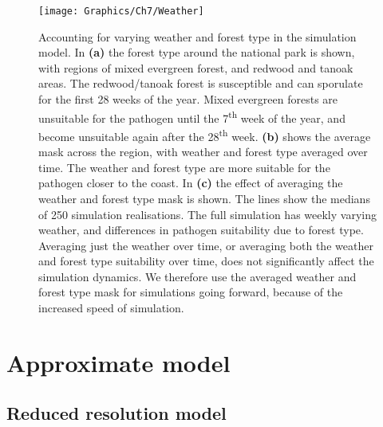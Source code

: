 \begin{figure}
    \begin{center}
        \texttt{[image: Graphics/Ch7/Weather]}
        \caption[Acounting for weather and forest type in the simulation model]{Accounting for varying weather and forest type in the simulation model. In \textbf{(a)} the forest type around the national park is shown, with regions of mixed evergreen forest, and redwood and tanoak areas. The redwood/tanoak forest is susceptible and can sporulate for the first 28 weeks of the year. Mixed evergreen forests are unsuitable for the pathogen until the 7\textsuperscript{th} week of the year, and become unsuitable again after the 28\textsuperscript{th} week. \textbf{(b)} shows the average mask across the region, with weather and forest type averaged over time. The weather and forest type are more suitable for the pathogen closer to the coast. In \textbf{(c)} the effect of averaging the weather and forest type mask is shown. The lines show the medians of 250 simulation realisations. The full simulation has weekly varying weather, and differences in pathogen suitability due to forest type. Averaging just the weather over time, or averaging both the weather and forest type suitability over time, does not significantly affect the simulation dynamics. We therefore use the averaged weather and forest type mask for simulations going forward, because of the increased speed of simulation.\label{fig:ch7:weather}}
    \end{center}
\end{figure}

\section{Approximate model}

\subsection{Reduced resolution model}

